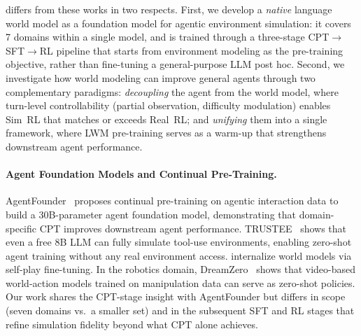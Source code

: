 \method differs from these works in two respects.
First, we develop a \emph{native} language world model as a foundation model for agentic environment simulation: it covers 7 domains within a single model, and is trained through a three-stage CPT$\to$SFT$\to$RL pipeline that starts from environment modeling as the pre-training objective, rather than fine-tuning a general-purpose LLM post hoc.
Second, we investigate how world modeling can improve general agents through two complementary paradigms: \emph{decoupling} the agent from the world model, where turn-level controllability (partial observation, difficulty modulation) enables Sim~RL that matches or exceeds Real~RL; and \emph{unifying} them into a single framework, where LWM pre-training serves as a warm-up that strengthens downstream agent performance.

\paragraph{Agent Foundation Models and Continual Pre-Training.}
AgentFounder~\citep{su2025scaling} proposes continual pre-training on agentic interaction data to build a 30B-parameter agent foundation model, demonstrating that domain-specific CPT improves downstream agent performance.
TRUSTEE~\citep{tang2026democratizingtoollearningenvironments} shows that even a free 8B LLM can fully simulate tool-use environments, enabling zero-shot agent training without any real environment access.
\citet{chen2025internalizing} internalize world models via self-play fine-tuning. In the robotics domain, DreamZero~\citep{ye2026world} shows that video-based world-action models trained on manipulation data can serve as zero-shot policies.
Our work shares the CPT-stage insight with AgentFounder but differs in scope (seven domains vs.\ a smaller set) and in the subsequent SFT and RL stages that refine simulation fidelity beyond what CPT alone achieves.

